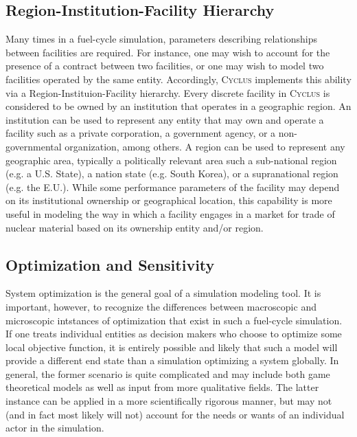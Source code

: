 \documentclass{anstrans}
\newcommand{\Cyclus}{\textsc{Cyclus }}
\begin{document}
\subsection{Region-Institution-Facility Hierarchy}
Many times in a fuel-cycle simulation, parameters describing relationships between facilities are required. For instance, one may wish to account for the presence of a contract between two facilities, or one may wish to model two facilities operated by the same entity. Accordingly, \Cyclus implements this ability via a Region-Instituion-Facility hierarchy. Every discrete facility in \Cyclus is considered to be owned by an institution that operates in a geographic region.  An institution can be used to represent any entity that may own and operate a facility such as a private corporation, a government agency, or a non-governmental organization, among others.  A region can be used to represent any geographic area, typically a politically relevant area such a sub-national region (e.g. a U.S. State), a nation state (e.g. South Korea), or a supranational region (e.g. the E.U.).  While some performance parameters of the facility may depend on its institutional ownership or geographical location, this capability is more useful in modeling the way in which a facility engages in a market for trade of nuclear material based on its ownership entity and/or region.

\subsection{Optimization and Sensitivity}
System optimization is the general goal of a simulation modeling tool. It is important, however, to recognize the differences between macroscopic and microscopic intstances of optimization that exist in such a fuel-cycle simulation. If one treats individual entities as decision makers who choose to optimize some local objective function, it is entirely possible and likely that such a model will provide a different end state than a simulation optimizing a system globally. In general, the former scenario is quite complicated and may include both game theoretical models as well as input from more qualitative fields. The latter instance can be applied in a more scientifically rigorous manner, but may not (and in fact most likely will not) account for the needs or wants of an individual actor in the simulation.
\end{document}
